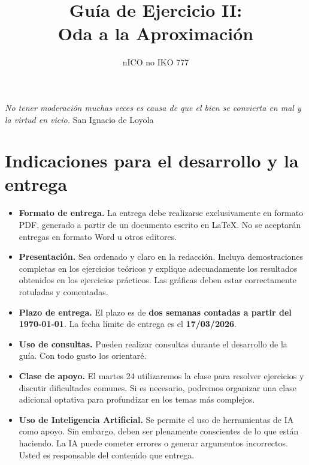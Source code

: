 \documentclass[11pt,a4paper]{article}
\title{Guía de Ejercicio II:\\Oda a la Aproximación}
\author{nICO no IKO 777}
\date{}
\theoremstyle{ejercicio}
\begin{document}
\maketitle
\textit{No tener moderación muchas veces es causa de que el bien se convierta en mal y la virtud en vicio.}  San Ignacio de Loyola


\section*{Indicaciones para el desarrollo y la entrega}

\begin{itemize}

\item \textbf{Formato de entrega.}  
La entrega debe realizarse exclusivamente en formato PDF,
generado a partir de un documento escrito en \LaTeX.
No se aceptarán entregas en formato Word u otros editores.

\item \textbf{Presentación.}  
Sea ordenado y claro en la redacción.  
Incluya demostraciones completas en los ejercicios teóricos
y explique adecuadamente los resultados obtenidos en los ejercicios prácticos.
Las gráficas deben estar correctamente rotuladas y comentadas.

\item \textbf{Plazo de entrega.}  
El plazo es de \textbf{dos semanas contadas a partir del \today}.  
La fecha límite de entrega es el \textbf{17/03/2026}. 

\item \textbf{Uso de consultas.}  
Pueden realizar consultas durante el desarrollo de la guía.
Con todo gusto los orientaré.

\item \textbf{Clase de apoyo.}  
El martes 24 utilizaremos la clase para resolver ejercicios
y discutir dificultades comunes.  
Si es necesario, podremos organizar una clase adicional optativa
para profundizar en los temas más complejos.

\item \textbf{Uso de Inteligencia Artificial.}  
Se permite el uso de herramientas de IA como apoyo.
Sin embargo, deben ser plenamente conscientes de lo que están haciendo.
La IA puede cometer errores o generar argumentos incorrectos.
Usted es responsable del contenido que entrega.

\end{itemize}
\end{document}
